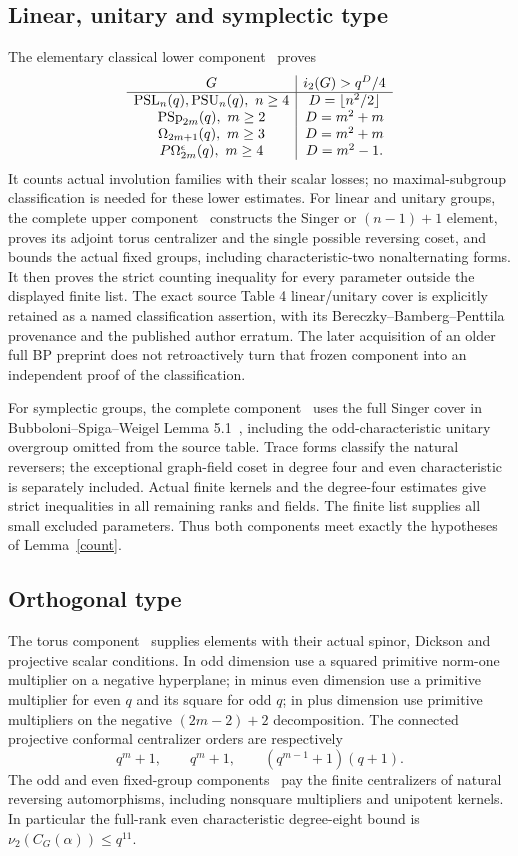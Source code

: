 \documentclass[11pt,a4paper]{article}
\newcommand{\ii}{i_2}\newcommand{\nuu}{\nu_2}
\begin{document}
\subsection{Linear, unitary and symplectic type}
The elementary classical lower component~\cite{Lower} proves
\[
\begin{array}{c|c}
G&\ii(G)>q^D/4\\\hline
\PSL_n(q),\PSU_n(q),\ n\ge4&D=\lfloor n^2/2\rfloor\\
\PSp_{2m}(q),\ m\ge2&D=m^2+m\\
\Om_{2m+1}(q),\ m\ge3&D=m^2+m\\
P\Om_{2m}^{\epsilon}(q),\ m\ge4&D=m^2-1.
\end{array}
\]
It counts actual involution families with their scalar losses; no
maximal-subgroup classification is needed for these lower estimates.
For linear and unitary groups, the complete upper component~\cite{Linear}
constructs the Singer or $(n-1)+1$ element, proves its adjoint torus
centralizer and the single possible reversing coset, and bounds the
actual fixed groups, including characteristic-two nonalternating forms.
It then proves the strict counting inequality for every parameter outside
the displayed finite list. The exact source Table 4 linear/unitary cover
is explicitly retained as a named classification assertion, with its
Bereczky--Bamberg--Penttila provenance and the published author erratum.
The later acquisition of an older full BP preprint does not retroactively
turn that frozen component into an independent proof of the classification.

For symplectic groups, the complete component~\cite{Symplectic} uses the
full Singer cover in Bubboloni--Spiga--Weigel Lemma 5.1~\cite{BSW}, including the
odd-characteristic unitary overgroup omitted from the source table.
Trace forms classify the natural reversers; the exceptional graph-field
coset in degree four and even characteristic is separately included.
Actual finite kernels and the degree-four estimates give strict
inequalities in all remaining ranks and fields. The finite list supplies
all small excluded parameters. Thus both components meet exactly the
hypotheses of Lemma~\ref{count}.

\subsection{Orthogonal type}
The torus component~\cite{Tori} supplies elements with their actual
spinor, Dickson and projective scalar conditions. In odd dimension use
a squared primitive norm-one multiplier on a negative hyperplane; in
minus even dimension use a primitive multiplier for even $q$ and its
square for odd $q$; in plus dimension use primitive multipliers on the
negative $(2m-2)+2$ decomposition. The connected projective conformal
centralizer orders are respectively
\[
 q^m+1,\qquad q^m+1,\qquad(q^{m-1}+1)(q+1).
\]
The odd and even fixed-group components~\cite{Odd,Even} pay the finite
centralizers of natural reversing automorphisms, including nonsquare
multipliers and unipotent kernels. In particular the full-rank even
characteristic degree-eight bound is $\nuu(C_G(\alpha))\le q^{11}$.
\end{document}
